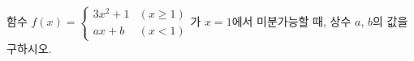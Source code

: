 함수 $f(x)=\begin{cases} 3x^2+1 & (x\ge 1) \\ ax+b & (x<1) \end{cases}$가 $x=1$에서 미분가능할 때, 상수 $a$, $b$의 값을 구하시오.

